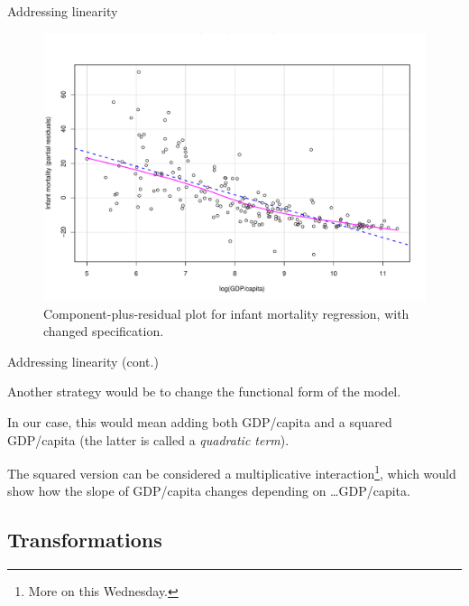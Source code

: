 \documentclass[12pt,english,pdf,xcolor=dvipsnames,aspectratio=169,handout]{beamer}\usepackage[]{graphicx}\usepackage[]{xcolor}
\begin{document}
\begin{frame}{Addressing linearity}



\begin{figure}
  \centering
  \includegraphics[scale=0.375]{../04-graphs/01-02.pdf}
  \caption{\label{fig:fig-03} Component-plus-residual plot for infant mortality regression, with changed specification.}
\end{figure}

\end{frame}



\begin{frame}{Addressing linearity (cont.)}

  Another strategy would be to change the functional form of the model.\bigskip

  In our case, this would mean adding both GDP/capita and a squared GDP/capita (the latter is called a \textit{quadratic term}).\bigskip

  The squared version can be considered a multiplicative interaction\footnote{More on this Wednesday.}, which would show how the slope of GDP/capita changes depending on \dots GDP/capita.

\end{frame}



\subsection{Transformations}
\end{document}

